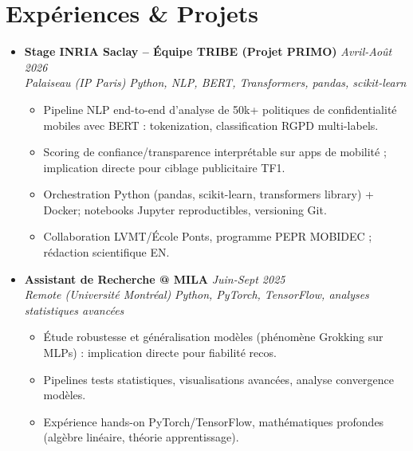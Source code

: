 \documentclass[a4paper,11pt]{article}
\begin{document}
\section{Exp\'eriences \& Projets}
\begin{itemize}[leftmargin=*, label=\tiny$\bullet$, nosep]
    \item \textbf{Stage INRIA Saclay -- \'Equipe TRIBE (Projet PRIMO)} \hfill \textit{Avril-Ao\^ut 2026} \\
    \textit{Palaiseau (IP Paris)} \hfill \textit{Python, NLP, BERT, Transformers, pandas, scikit-learn}
    \vspace{-2pt}
    \begin{itemize}[leftmargin=0.4cm, nosep, label=\tiny$\bullet$]
        \item \small{Pipeline NLP end-to-end d'analyse de 50k+ politiques de confidentialit\'e mobiles avec BERT : tokenization, classification RGPD multi-labels.}
        \item \small{Scoring de confiance/transparence interpr\'etable sur apps de mobilit\'e ; implication directe pour ciblage publicitaire TF1.}
        \item \small{Orchestration Python (pandas, scikit-learn, transformers library) + Docker; notebooks Jupyter reproductibles, versioning Git.}
        \item \small{Collaboration LVMT/\'Ecole Ponts, programme PEPR MOBIDEC ; r\'edaction scientifique EN.}
    \end{itemize}
    \vspace{3pt}

    \item \textbf{Assistant de Recherche @ MILA} \hfill \textit{Juin-Sept 2025} \\
    \textit{Remote (Universit\'e Montr\'eal)} \hfill \textit{Python, PyTorch, TensorFlow, analyses statistiques avanc\'ees}
    \vspace{-2pt}
    \begin{itemize}[leftmargin=0.4cm, nosep, label=\tiny$\bullet$]
        \item \small{\'Etude robustesse et g\'en\'eralisation mod\`eles (ph\'enom\`ene Grokking sur MLPs) : implication directe pour fiabilit\'e recos.}
        \item \small{Pipelines tests statistiques, visualisations avanc\'ees, analyse convergence mod\`eles.}
        \item \small{Exp\'erience hands-on PyTorch/TensorFlow, math\'ematiques profondes (alg\`ebre lin\'eaire, th\'eorie apprentissage).}
    \end{itemize}
    \vspace{3pt}


\end{itemize}
\end{document}
